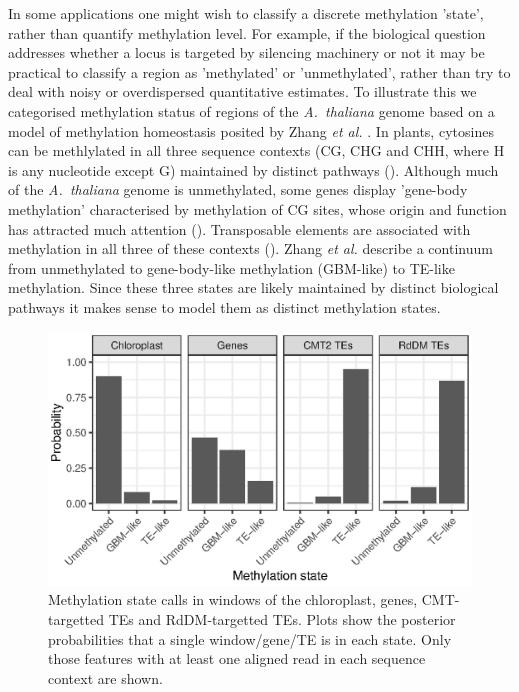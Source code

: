 \documentclass[10pt,letterpaper]{article}
\begin{document}
In some applications one might wish to classify a discrete methylation 'state', rather than quantify methylation level.
For example, if the biological question addresses whether a locus is targeted by silencing machinery or not it may be practical to classify a region as 'methylated' or 'unmethylated', rather than try to deal with noisy or overdispersed quantitative estimates.
To illustrate this we categorised methylation status of regions of the \emph{A.~thaliana} genome based on a model of methylation homeostasis posited by Zhang \textit{et al.} \cite{zhang2020natural}.
In plants, cytosines can be methlylated in all three sequence contexts (CG, CHG and CHH, where H is any nucleotide except G) maintained by distinct pathways (\cite{law2010establishing}).
Although much of the \emph{A.~thaliana} genome is unmethylated, some genes display 'gene-body methylation' characterised by methylation of CG sites, whose origin and function has attracted much attention (\cite{muyle2022gene}). 
Transposable elements are associated with methylation in all three of these contexts (\cite{cokus2008shotgun, lister2008highly}).
Zhang \textit{et al.} \cite{zhang2020natural} describe a continuum from unmethylated to gene-body-like methylation (GBM-like) to TE-like methylation.
Since these three states are likely maintained by distinct biological pathways it makes sense to model them as distinct methylation states.

\begin{figure}
    \centering
    \includegraphics{figure4.eps}
    \caption{
        Methylation state calls in windows of the chloroplast, genes, CMT-targetted TEs and RdDM-targetted TEs.
        Plots show the posterior probabilities that a single window/gene/TE is in each state.
        Only those features with at least one aligned read in each sequence context are shown.
    }
    \label{fig:meth-state}
\end{figure}
\end{document}
